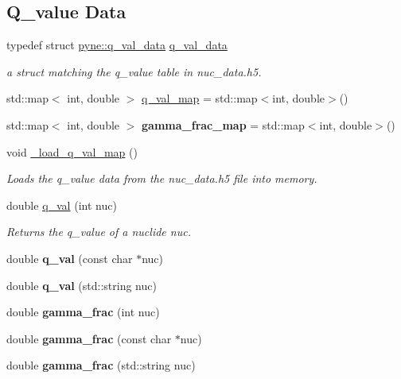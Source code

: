 \subsection*{Q\+\_\+value Data}
\begin{DoxyCompactItemize}
\item 
\mbox{\label{namespacepyne_ad5b32541d47e22b0fc6a49061bf7f5e2}} 
typedef struct \hyperlink{structpyne_1_1q__val__data}{pyne\+::q\+\_\+val\+\_\+data} \hyperlink{namespacepyne_ad5b32541d47e22b0fc6a49061bf7f5e2}{q\+\_\+val\+\_\+data}
\begin{DoxyCompactList}\small\item\em a struct matching the q\+\_\+value table in nuc\+\_\+data.\+h5. \end{DoxyCompactList}\item 
std\+::map$<$ int, double $>$ \hyperlink{namespacepyne_af7b850fa105454bc35f4167d41071239}{q\+\_\+val\+\_\+map} = std\+::map$<$int, double$>$()
\item 
\mbox{\label{namespacepyne_aa7d4bc17776ce7606f70cb3d78f2c563}} 
std\+::map$<$ int, double $>$ {\bfseries gamma\+\_\+frac\+\_\+map} = std\+::map$<$int, double$>$()
\item 
\mbox{\label{namespacepyne_a4bc2d6406c60d62e570ace1b1710af0a}} 
void \hyperlink{namespacepyne_a4bc2d6406c60d62e570ace1b1710af0a}{\+\_\+load\+\_\+q\+\_\+val\+\_\+map} ()
\begin{DoxyCompactList}\small\item\em Loads the q\+\_\+value data from the nuc\+\_\+data.\+h5 file into memory. \end{DoxyCompactList}\item 
double \hyperlink{namespacepyne_a9b7f5a9fbe46dc523263f22f295de782}{q\+\_\+val} (int nuc)
\begin{DoxyCompactList}\small\item\em Returns the q\+\_\+value of a nuclide {\itshape nuc}. \end{DoxyCompactList}\item 
\mbox{\label{namespacepyne_a61a485205f26fb413a232e093af4af96}} 
double {\bfseries q\+\_\+val} (const char $\ast$nuc)
\item 
\mbox{\label{namespacepyne_a256eaa2fcfedbcef6205ea2f3ced15fb}} 
double {\bfseries q\+\_\+val} (std\+::string nuc)
\item 
\mbox{\label{namespacepyne_aef2fb37465ee46726235ea5b16ccad52}} 
double {\bfseries gamma\+\_\+frac} (int nuc)
\item 
\mbox{\label{namespacepyne_a6f6f8aeab28c0e355bfcd6e73b2d0147}} 
double {\bfseries gamma\+\_\+frac} (const char $\ast$nuc)
\item 
\mbox{\label{namespacepyne_a65ee3d70d7060637571f65249dc116f9}} 
double {\bfseries gamma\+\_\+frac} (std\+::string nuc)
\end{DoxyCompactItemize}
